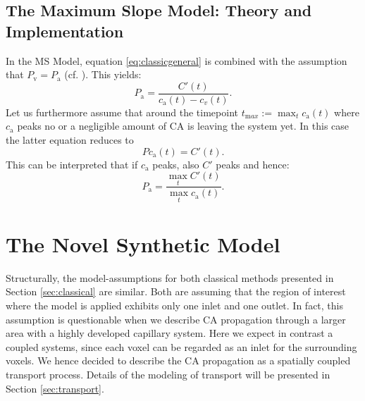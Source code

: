 \documentclass[paper=a4, fontsize=11pt,parskip=half,headings=small]{scrartcl}
\newcommand{\ca}{c_\mathrm{a}}
\newcommand{\Pa}{P_{\mathrm{a}}}
\newcommand{\Pout}{P_{\mathrm{v}}}
\begin{document}
	
	
	
	\subsection{The Maximum Slope Model: Theory and Implementation}\label{sec:ms}	
	In the MS Model, equation \eqref{eq:classicgeneral} is combined with the assumption that $\Pout = \Pa$ (cf. \cite{klotz99}).
	This yields:
	\[
		\Pa = \frac{C'(t)}{\ca(t) - c_v(t)}.
	\]
	Let us furthermore assume that around the timepoint $t_{\mathrm max}:=\max_{t}\ca(t)$ where $\ca$ peaks no or a negligible amount of CA is leaving the system yet.
	In this case the latter equation reduces to
	\[
		P\ca(t) = C'(t).
	\]
	This can be interpreted that if $\ca$ peaks, also $C'$ peaks and hence:
	\begin{equation}\label{eq:MS}
		\Pa = \frac{\max_{t}C'(t)}{\max_{t}\ca(t)}.
	\end{equation}
	
	
	
	\section{The Novel Synthetic Model}\label{sec:synthetic}
	
	Structurally, the model-assumptions for both classical methods presented in Section \ref{sec:classical} are similar.
	Both are assuming that the region of interest where the model is applied exhibits only one inlet and one outlet.
	In fact, this assumption is questionable when we describe CA propagation through a larger area with a highly developed capillary system.
	Here we expect in contrast a coupled systems, since each voxel can be regarded as an inlet for the surrounding voxels.
	We hence decided to describe the CA propagation as a spatially coupled transport process. 
	Details of the modeling of transport will be presented in Section \ref{sec:transport}.	
	
\end{document}
